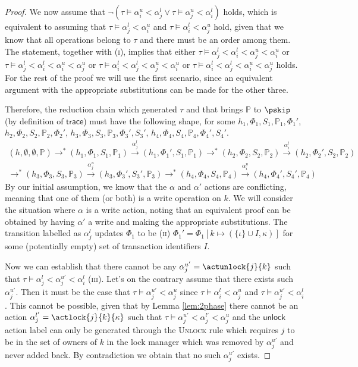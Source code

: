 \begin{proof}
We now assume that $\lnot \left( \tau \vDash \alpha_i^u < \alpha_j^l  \lor \tau \vDash \alpha_j^u < \alpha_i^l \right)$ holds, which is equivalent to assuming that $\tau \vDash \alpha_j^l < \alpha_i^u$ and $\tau \vDash \alpha_i^l < \alpha_j^u$ hold, given that we know that all operations belong to $\tau$ and there must be an order among them. The statement, together with (\textsc{i}), implies that either $\tau \vDash \alpha_j^l < \alpha_i^l < \alpha_j^u < \alpha_i^u$ or $\tau \vDash \alpha_j^l < \alpha_i^l < \alpha_i^u < \alpha_j^u$ or $\tau \vDash \alpha_i^l < \alpha_j^l < \alpha_j^u < \alpha_i^u$ or $\tau \vDash \alpha_i^l < \alpha_j^l < \alpha_i^u < \alpha_j^u$ holds. For the rest of the proof we will use the first scenario, since an equivalent argument with the appropriate substitutions can be made for the other three.

Therefore, the reduction chain which generated $\tau$ and that brings $\mathds{P}$ to $\pskip$ (by definition of $\mathsf{trace}$) must have the following shape, for some $h_1, \Phi_1, S_1, \mathds{P}_1, \Phi_1'$, $h_2, \Phi_2, S_2, \mathds{P}_2, \Phi_2'$, $h_3, \Phi_3, S_3, \mathds{P}_3, \Phi_3', S_3'$, $h_4, \Phi_4, S_4, \mathds{P}_4, \Phi_4', S_4'$.
\begin{gather*}
(h, \emptyset, \emptyset, \mathds{P}) \rightarrow^* (h_1, \Phi_1, S_1, \mathds{P}_1) \xrightarrow{\alpha_j^l} (h_1, \Phi_1', S_1, \mathds{P}_1) \rightarrow^* (h_2, \Phi_2, S_2, \mathds{P}_2) \xrightarrow{\alpha_i^l} (h_2, \Phi_2', S_2, \mathds{P}_2)
\\
\rightarrow^* (h_3, \Phi_3, S_3, \mathds{P}_3) \xrightarrow{\alpha_j^u} (h_3, \Phi_3', S_3', \mathds{P}_3) \rightarrow^* (h_4, \Phi_4, S_4, \mathds{P}_4) \xrightarrow{\alpha_i^u} (h_4, \Phi_4', S_4', \mathds{P}_4)
\end{gather*}
By our initial assumption, we know that the $\alpha$ and $\alpha'$ actions are conflicting, meaning that one of them (or both) is a write operation on $k$. We will consider the situation where $\alpha$ is a write action, noting that an equivalent proof can be obtained by having $\alpha'$ a write and making the appropriate substitutions. The transition labelled as $\alpha_j^l$ updates $\Phi_1$ to be (\textsc{ii}) $\Phi_1' = \Phi_1[k \mapsto (\{\iota\} \cup I, \kappa)]$ for some (potentially empty) set of transaction identifiers $I$.

Now we can establish that there cannot be any $\alpha_j^{u'} = \actunlock{j}{k}$ such that $\tau \vDash \alpha_j^l < \alpha_j^{u'} < \alpha_i^l$ (\textsc{iii}). Let's on the contrary assume that there exists such $\alpha_j^{u'}$. Then it must be the case that $\tau \vDash \alpha_j^{u'} < \alpha_j^{u}$ since $\tau \vDash \alpha_i^l < \alpha_j^u$ and $\tau \vDash \alpha_j^{u'} < \alpha_i^l$. This cannot be possible, given that by Lemma \ref{lem:2phase} there cannot be an action $\alpha_j^{l'} = \actlock{j}{k}{\kappa}$ such that $\tau \vDash \alpha_j^{u'} < \alpha_j^{l'} < \alpha_j^{u}$ and the $\mathsf{unlock}$ action label can only be generated through the \textsc{Unlock} rule which requires $j$ to be in the set of owners of $k$ in the lock manager which was removed by $\alpha_j^{u'}$ and never added back. By contradiction we obtain that no such $\alpha_j^{u'}$ exists.


\end{proof}
